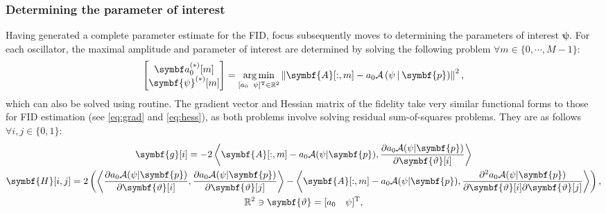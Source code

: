 \subsubsection{Determining the parameter of interest}
Having generated a complete parameter estimate for the \ac{FID}, focus
subsequently moves to determining the parameters of interest $\symbf{\psi}$.
For each oscillator, the maximal amplitude and parameter of
interest are determined by solving the following problem $\forall m \in \lbrace
0, \cdots, M-1 \rbrace$:
\begin{equation}
    \begin{bmatrix}
        \bda_0^{(*)}[m] \\
        \symbf{\psi}^{(*)}[m]
    \end{bmatrix} =
    \argmin_{
        [a_0 \hspace*{5pt} \psi]\T \in \mathbb{R}^2
    }
    \left\lVert
        \symbf{A}[:, m] - a_0 \mathcal{A} \left(\psi \hspace*{2pt} | \hspace*{2pt} \symbf{p}\right)
    \right\rVert^2,
\end{equation}
which can also be solved using  routine. The gradient vector and Hessian
matrix of the fidelity take very similar functional forms to those for \ac{FID}
estimation (see \eqref{eq:grad} and \eqref{eq:hess}), as both problems
involve solving residual sum-of-squares problems.
They are as follows $\forall i, j \in \lbrace 0, 1 \rbrace$:
\begin{subequations}
    \begin{gather}
        \symbf{g}[i] =
            -2 \left \langle
                \symbf{A}[:, m] - a_0 \mathcal{A}(\psi | \symbf{p}),
                \frac{\partial a_0 \mathcal{A} (\psi | \symbf{p})}
                {\partial \symbf{\vartheta}[i]}
            \right \rangle\\
        \symbf{H}[i,j] =
            2 \left( \left \langle
                \frac{\partial a_0 \mathcal{A} (\psi | \symbf{p})}{\partial \symbf{\vartheta}[i]},
                \frac{\partial a_0 \mathcal{A} (\psi | \symbf{p})}{\partial \symbf{\vartheta}[j]}
            \right \rangle -
            \left \langle
                \symbf{A}[:, m] - a_0 \mathcal{A}(\psi | \symbf{p}),
                \frac{\partial^2 a_0 \mathcal{A} (\psi | \symbf{p})}{\partial \symbf{\vartheta}[i]\partial \symbf{\vartheta}[j]}
            \right \rangle \right), \\
            \mathbb{R}^2 \ni \symbf{\vartheta} = [a_0 \hspace*{10pt} \psi]\T,
    \end{gather}
\end{subequations}
